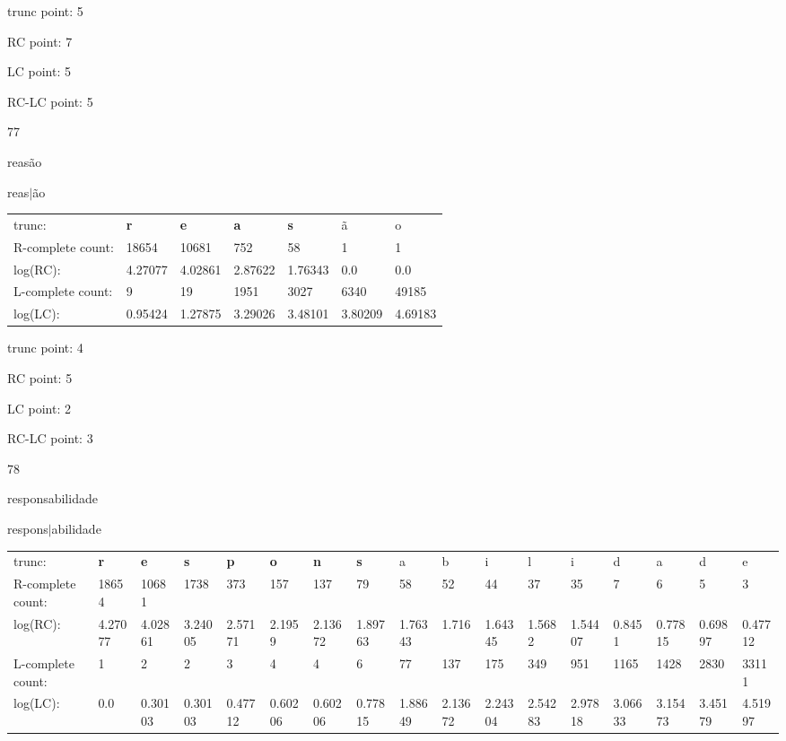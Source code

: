\documentclass{article}
\begin{document}
trunc point: 5

RC point: 7

LC point: 5

RC-LC point: 5

\vspace{3em}



77

reasão

reas$|$ão

\vspace{1em}

\begin{tabular}{l|llllll}

trunc: & {\color{red}\bf r} & {\color{red}\bf e} & {\color{red}\bf a} & {\color{red}\bf s} & ã & o \\ 
R-complete count: & 18654 & 10681 & 752 & 58 & 1 & 1 \\ 
log(RC): & 4.27077 & 4.02861 & 2.87622 & 1.76343 & 0.0 & 0.0 \\ 
L-complete count: & 9 & 19 & 1951 & 3027 & 6340 & 49185 \\ 
log(LC): & 0.95424 & 1.27875 & 3.29026 & 3.48101 & 3.80209 & 4.69183 \\ 
\end{tabular}

trunc point: 4

RC point: 5

LC point: 2

RC-LC point: 3

\vspace{3em}



78

responsabilidade

respons$|$abilidade

\vspace{1em}

\begin{tabular}{l|llllllllllllllll}

trunc: & {\color{red}\bf r} & {\color{red}\bf e} & {\color{red}\bf s} & {\color{red}\bf p} & {\color{red}\bf o} & {\color{red}\bf n} & {\color{red}\bf s} & a & b & i & l & i & d & a & d & e \\ 
R-complete count: & 18654 & 10681 & 1738 & 373 & 157 & 137 & 79 & 58 & 52 & 44 & 37 & 35 & 7 & 6 & 5 & 3 \\ 
log(RC): & 4.27077 & 4.02861 & 3.24005 & 2.57171 & 2.1959 & 2.13672 & 1.89763 & 1.76343 & 1.716 & 1.64345 & 1.5682 & 1.54407 & 0.8451 & 0.77815 & 0.69897 & 0.47712 \\ 
L-complete count: & 1 & 2 & 2 & 3 & 4 & 4 & 6 & 77 & 137 & 175 & 349 & 951 & 1165 & 1428 & 2830 & 33111 \\ 
log(LC): & 0.0 & 0.30103 & 0.30103 & 0.47712 & 0.60206 & 0.60206 & 0.77815 & 1.88649 & 2.13672 & 2.24304 & 2.54283 & 2.97818 & 3.06633 & 3.15473 & 3.45179 & 4.51997 \\ 
\end{tabular}
\end{document}

